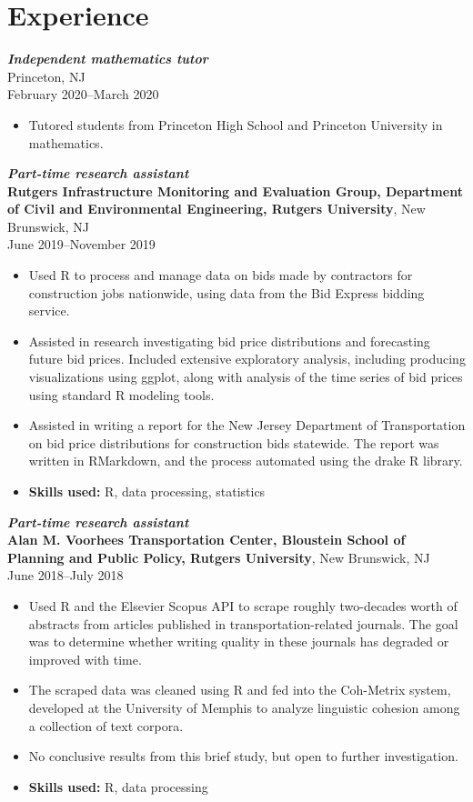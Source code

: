 \documentclass[letterpaper,12pt]{article}
\begin{document}
\section*{Experience}

\textit{\textbf{Independent mathematics tutor}} \\
Princeton, NJ \\
February 2020--March 2020
\begin{itemize}
\item Tutored students from Princeton High School and Princeton
  University in mathematics.
\end{itemize}

\textit{\textbf{Part-time research assistant}} \\
\textbf{Rutgers Infrastructure Monitoring and Evaluation Group,
  Department of Civil and Environmental Engineering, Rutgers
  University},
New Brunswick, NJ \\
June 2019--November 2019
\begin{itemize}
\item Used R to process and manage data on bids made by contractors
  for construction jobs nationwide, using data from the Bid Express
  bidding service.
\item Assisted in research investigating bid price distributions and
  forecasting future bid prices. Included extensive exploratory
  analysis, including producing visualizations using ggplot, along
  with analysis of the time series of bid prices using standard R
  modeling tools.
\item Assisted in writing a report for the New Jersey Department of
  Transportation on bid price distributions for construction bids
  statewide. The report was written in RMarkdown, and the process
  automated using the drake R library.
\item \textbf{Skills used:} R, data processing, statistics
\end{itemize}

\textit{\textbf{Part-time research assistant}} \\
\textbf{Alan M. Voorhees Transportation Center, Bloustein School of
  Planning and Public Policy, Rutgers University},
New Brunswick, NJ \\
June 2018--July 2018
\begin{itemize}
\item Used R and the Elsevier Scopus API to scrape roughly two-decades
  worth of abstracts from articles published in transportation-related
  journals. The goal was to determine whether writing quality in these
  journals has degraded or improved with time.
\item The scraped data was cleaned using R and fed into the Coh-Metrix
  system, developed at the University of Memphis to analyze linguistic
  cohesion among a collection of text corpora.
\item No conclusive results from this brief study, but open to further
  investigation.
\item \textbf{Skills used:} R, data processing
\end{itemize}
\end{document}
